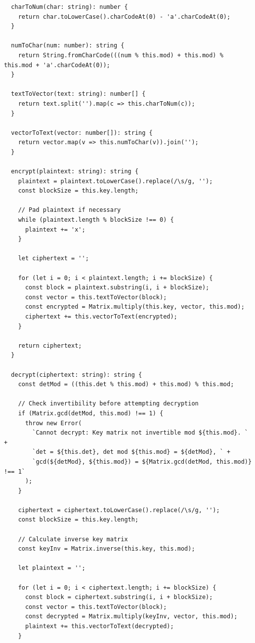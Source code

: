 \documentclass[a4paper,12pt]{article}
\begin{document}
\begin{verbatim}
  charToNum(char: string): number {
    return char.toLowerCase().charCodeAt(0) - 'a'.charCodeAt(0);
  }
  
  numToChar(num: number): string {
    return String.fromCharCode(((num % this.mod) + this.mod) % this.mod + 'a'.charCodeAt(0));
  }
  
  textToVector(text: string): number[] {
    return text.split('').map(c => this.charToNum(c));
  }
  
  vectorToText(vector: number[]): string {
    return vector.map(v => this.numToChar(v)).join('');
  }
  
  encrypt(plaintext: string): string {
    plaintext = plaintext.toLowerCase().replace(/\s/g, '');
    const blockSize = this.key.length;
    
    // Pad plaintext if necessary
    while (plaintext.length % blockSize !== 0) {
      plaintext += 'x';
    }
    
    let ciphertext = '';
    
    for (let i = 0; i < plaintext.length; i += blockSize) {
      const block = plaintext.substring(i, i + blockSize);
      const vector = this.textToVector(block);
      const encrypted = Matrix.multiply(this.key, vector, this.mod);
      ciphertext += this.vectorToText(encrypted);
    }
    
    return ciphertext;
  }
  
  decrypt(ciphertext: string): string {
    const detMod = ((this.det % this.mod) + this.mod) % this.mod;
    
    // Check invertibility before attempting decryption
    if (Matrix.gcd(detMod, this.mod) !== 1) {
      throw new Error(
        `Cannot decrypt: Key matrix not invertible mod ${this.mod}. ` +
        `det = ${this.det}, det mod ${this.mod} = ${detMod}, ` +
        `gcd(${detMod}, ${this.mod}) = ${Matrix.gcd(detMod, this.mod)} !== 1`
      );
    }
    
    ciphertext = ciphertext.toLowerCase().replace(/\s/g, '');
    const blockSize = this.key.length;
    
    // Calculate inverse key matrix
    const keyInv = Matrix.inverse(this.key, this.mod);
    
    let plaintext = '';
    
    for (let i = 0; i < ciphertext.length; i += blockSize) {
      const block = ciphertext.substring(i, i + blockSize);
      const vector = this.textToVector(block);
      const decrypted = Matrix.multiply(keyInv, vector, this.mod);
      plaintext += this.vectorToText(decrypted);
    }
    

\end{verbatim}
\end{document}
